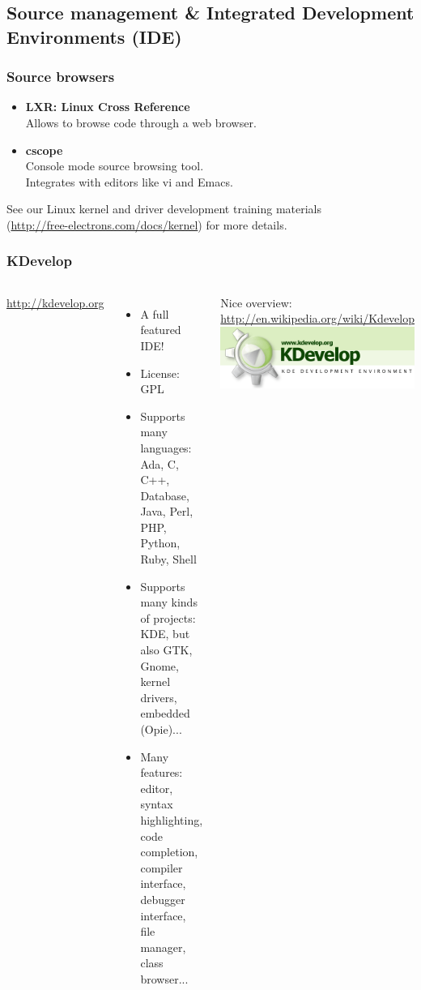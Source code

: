\subsection[Source management \& IDEs]{Source management \& Integrated
  Development Environments (IDE)}

\begin{frame}
  \frametitle{Source browsers}
  \begin{itemize}
  \item {\bf LXR: Linux Cross Reference}\\
    Allows to browse code through a web browser.
  \item {\bf cscope}\\
    Console mode source browsing tool.\\
    Integrates with editors like vi and Emacs.
\end{itemize}
See our Linux kernel and driver development training materials\\
(\url{http://free-electrons.com/docs/kernel}) for more details.
\end{frame}

\begin{frame}
  \frametitle{KDevelop}
  \begin{columns}[T]
    \url{http://kdevelop.org}
    \begin{itemize}
    \item A full featured IDE!
    \item License: GPL
    \item Supports many languages: Ada, C, C++, Database, Java, Perl,
      PHP, Python, Ruby, Shell
    \item Supports many kinds of projects: KDE, but also GTK, Gnome,
      kernel drivers, embedded (Opie)...
    \item Many features: editor, syntax highlighting, code completion,
      compiler interface, debugger interface, file manager, class
      browser...
    \end{itemize}
    Nice overview: \url{http://en.wikipedia.org/wiki/Kdevelop}
    \includegraphics[width=\textwidth]{slides/sysdev-application-development/kdevelop.png}
  \end{columns}
\end{frame}

